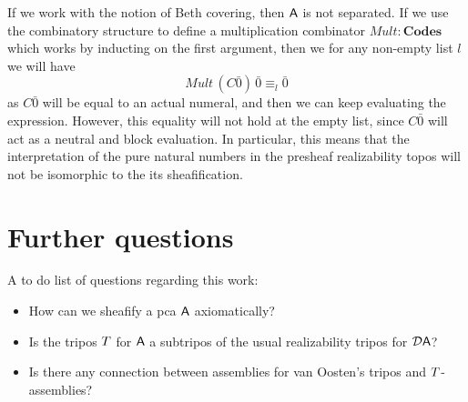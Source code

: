 \documentclass[11pt]{article}
\begin{document}
If we work with the notion of Beth covering, then \(\mathsf{A}\) is not separated.
%
If we use the combinatory structure to define a multiplication combinator
\({Mult}:\textbf{Codes}\) which works by inducting on the first argument, then
we for any non-empty list \(l\) we will have
%
\[
  {{Mult}\,(C\bar{0})\,\bar{0}} \equiv_{l} \bar{0}
\]
%
as \(C\bar{0}\) will be equal to an actual numeral, and then we can keep
evaluating the expression.
%
However, this equality will not hold at the empty list, since \(C{\bar{0}}\)
will act as a neutral and block evaluation.
%
In particular, this means that the interpretation of the pure natural numbers
in the presheaf realizability topos will not be isomorphic to the
its sheafification.

\newpage

\section{Further questions}

A to do list of questions regarding this work:
%
\begin{itemize}
  \item How can we sheafify a pca \(\mathsf{A}\) axiomatically?
  \item Is the tripos \(T\) for \(\mathsf{A}\) a subtripos of the usual realizability
    tripos for \(\mathcal{D}{\mathsf{A}}\)?
  \item Is there any connection between assemblies for van Oosten's tripos and
    \(T\)-assemblies?
\end{itemize}

\newpage

\printbibliography{}
\end{document}
